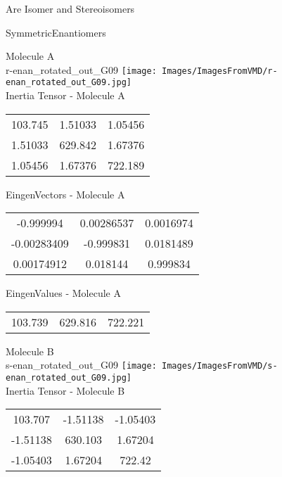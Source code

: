 \begin{center}
\vtab
\vtab
\textcolor{NavyBlue}{\Large Are Isomer and Stereoisomers}
\end{center}
\newpage

\vtab[-2cm]
\begin{center}
{\large SymmetricEnantiomers}
\end{center}
\begin{multicols}{2}
\begin{center}
Molecule A \\ 
r-enan\_rotated\_out\_G09
\texttt{[image: Images/ImagesFromVMD/r-enan\_rotated\_out\_G09.jpg]}
\\
Inertia Tensor - Molecule A \\
\vtab
\begin{tabular}{|c c c|}
103.745	 & 	1.51033	 & 	1.05456	 \\
1.51033	 & 	629.842	 & 	1.67376	 \\
1.05456	 & 	1.67376	 & 	722.189
\end{tabular}

\vtab
 EingenVectors - Molecule A     \\
\vtab
\begin{tabular}{|c c c|}
-0.999994	 & 	0.00286537	 & 	0.0016974	 \\
-0.00283409	 & 	-0.999831	 & 	0.0181489	 \\
0.00174912	 & 	0.018144	 & 	0.999834
\end{tabular}

\vtab
 EingenValues - Molecule A     \\
\vtab
\begin{tabular}{|c c c|}
103.739	 & 	629.816	 & 	722.221
\end{tabular}
\columnbreak

Molecule B \\ 
s-enan\_rotated\_out\_G09
\texttt{[image: Images/ImagesFromVMD/s-enan\_rotated\_out\_G09.jpg]}
\\
Inertia Tensor - Molecule B \\
\vtab
\begin{tabular}{|c c c|}
103.707	 & 	-1.51138	 & 	-1.05403	 \\
-1.51138	 & 	630.103	 & 	1.67204	 \\
-1.05403	 & 	1.67204	 & 	722.42
\end{tabular}


\end{center}
\end{multicols}
